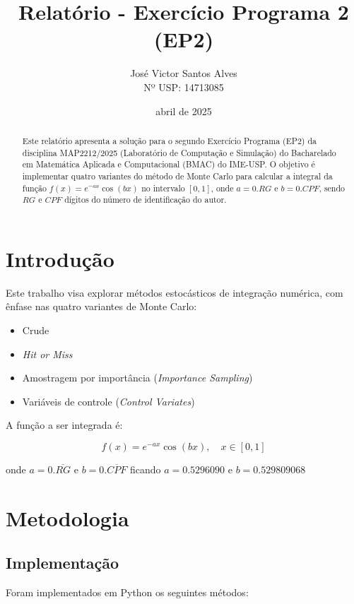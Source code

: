 \documentclass[12pt, a4paper]{article}
\title{Relatório - Exercício Programa 2 (EP2)}
\author{José Victor Santos Alves \\ Nº USP: 14713085}
\date{abril de 2025}
\begin{document}
\maketitle
\thispagestyle{empty}

\begin{abstract}
Este relatório apresenta a solução para o segundo Exercício Programa (EP2) da disciplina MAP2212/2025 (Laboratório de Computação e Simulação) do Bacharelado em Matemática Aplicada e Computacional (BMAC) do IME-USP. O objetivo é implementar quatro variantes do método de Monte Carlo para calcular a integral da função \( f(x) = e^{-ax}\cos(bx) \) no intervalo \([0,1]\), onde \( a = 0.RG \) e \( b = 0.CPF \), sendo \( RG \) e \( CPF \) dígitos do número de identificação do autor.
\end{abstract}

\section{Introdução}
\label{sec:intro}

Este trabalho visa explorar métodos estocásticos de integração numérica, com ênfase nas quatro variantes de Monte Carlo:

\begin{itemize}
    \item Crude
    \item \textit{Hit or Miss}
    \item Amostragem por importância (\textit{Importance Sampling})
    \item Variáveis de controle (\textit{Control Variates})
\end{itemize}

A função a ser integrada é:

\begin{equation}
    f(x) = e^{-ax}\cos(bx), \quad x \in [0,1]
    \label{eq:funcao}
\end{equation}

onde \( a = 0.\overline{RG} \) e \( b = 0.\overline{CPF} \) ficando \(a = 0.5296090 \) e \(b = 0.529809068\)

\section{Metodologia}
\label{sec:metodo}

\subsection{Implementação}
Foram implementados em Python os seguintes métodos:
\end{document}
